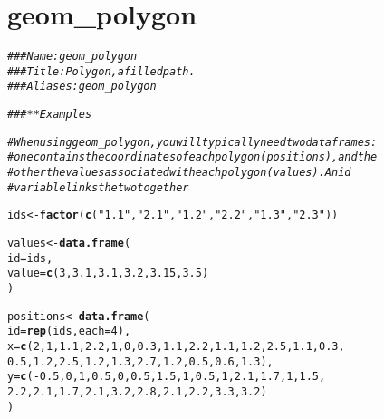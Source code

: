 \documentclass[a4paper,titlepage]{tufte-handout}\usepackage[]{graphicx}\usepackage[]{color}
\makeatletter
\newcommand{\hlnum}[1]{\textcolor[rgb]{0.686,0.059,0.569}{#1}}%
\newcommand{\hlstr}[1]{\textcolor[rgb]{0.192,0.494,0.8}{#1}}%
\newcommand{\hlcom}[1]{\textcolor[rgb]{0.678,0.584,0.686}{\textit{#1}}}%
\newcommand{\hlopt}[1]{\textcolor[rgb]{0,0,0}{#1}}%
\newcommand{\hlstd}[1]{\textcolor[rgb]{0.345,0.345,0.345}{#1}}%
\newcommand{\hlkwb}[1]{\textcolor[rgb]{0.69,0.353,0.396}{#1}}%
\newcommand{\hlkwc}[1]{\textcolor[rgb]{0.333,0.667,0.333}{#1}}%
\newcommand{\hlkwd}[1]{\textcolor[rgb]{0.737,0.353,0.396}{\textbf{#1}}}%
\newenvironment{kframe}{%
 \def\at@end@of@kframe{}%
 \ifinner\ifhmode%
  \def\at@end@of@kframe{\end{minipage}}%
  \begin{minipage}{\columnwidth}%
 \fi\fi%
 \def\FrameCommand##1{\hskip\@totalleftmargin \hskip-\fboxsep
 \colorbox{shadecolor}{##1}\hskip-\fboxsep
     \hskip-\linewidth \hskip-\@totalleftmargin \hskip\columnwidth}%
 \MakeFramed {\advance\hsize-\width
   \@totalleftmargin\z@ \linewidth\hsize
   \@setminipage}}%
 {\par\unskip\endMakeFramed%
 \at@end@of@kframe}
\newenvironment{knitrout}{}{} %
\makeatother
\begin{document}
\section{geom\_polygon}

\begin{knitrout}
\color{fgcolor}\begin{kframe}
\begin{alltt}
\hlcom{### Name: geom_polygon}
\hlcom{### Title: Polygon, a filled path.}
\hlcom{### Aliases: geom_polygon}

\hlcom{### ** Examples}

\hlcom{# When using geom_polygon, you will typically need two data frames:}
\hlcom{# one contains the coordinates of each polygon (positions),  and the}
\hlcom{# other the values associated with each polygon (values).  An id}
\hlcom{# variable links the two together}

\hlstd{ids} \hlkwb{<-} \hlkwd{factor}\hlstd{(}\hlkwd{c}\hlstd{(}\hlstr{"1.1"}\hlstd{,} \hlstr{"2.1"}\hlstd{,} \hlstr{"1.2"}\hlstd{,} \hlstr{"2.2"}\hlstd{,} \hlstr{"1.3"}\hlstd{,} \hlstr{"2.3"}\hlstd{))}

\hlstd{values} \hlkwb{<-} \hlkwd{data.frame}\hlstd{(}
  \hlkwc{id} \hlstd{= ids,}
  \hlkwc{value} \hlstd{=} \hlkwd{c}\hlstd{(}\hlnum{3}\hlstd{,} \hlnum{3.1}\hlstd{,} \hlnum{3.1}\hlstd{,} \hlnum{3.2}\hlstd{,} \hlnum{3.15}\hlstd{,} \hlnum{3.5}\hlstd{)}
\hlstd{)}

\hlstd{positions} \hlkwb{<-} \hlkwd{data.frame}\hlstd{(}
  \hlkwc{id} \hlstd{=} \hlkwd{rep}\hlstd{(ids,} \hlkwc{each} \hlstd{=} \hlnum{4}\hlstd{),}
  \hlkwc{x} \hlstd{=} \hlkwd{c}\hlstd{(}\hlnum{2}\hlstd{,} \hlnum{1}\hlstd{,} \hlnum{1.1}\hlstd{,} \hlnum{2.2}\hlstd{,} \hlnum{1}\hlstd{,} \hlnum{0}\hlstd{,} \hlnum{0.3}\hlstd{,} \hlnum{1.1}\hlstd{,} \hlnum{2.2}\hlstd{,} \hlnum{1.1}\hlstd{,} \hlnum{1.2}\hlstd{,} \hlnum{2.5}\hlstd{,} \hlnum{1.1}\hlstd{,} \hlnum{0.3}\hlstd{,}
  \hlnum{0.5}\hlstd{,} \hlnum{1.2}\hlstd{,} \hlnum{2.5}\hlstd{,} \hlnum{1.2}\hlstd{,} \hlnum{1.3}\hlstd{,} \hlnum{2.7}\hlstd{,} \hlnum{1.2}\hlstd{,} \hlnum{0.5}\hlstd{,} \hlnum{0.6}\hlstd{,} \hlnum{1.3}\hlstd{),}
  \hlkwc{y} \hlstd{=} \hlkwd{c}\hlstd{(}\hlopt{-}\hlnum{0.5}\hlstd{,} \hlnum{0}\hlstd{,} \hlnum{1}\hlstd{,} \hlnum{0.5}\hlstd{,} \hlnum{0}\hlstd{,} \hlnum{0.5}\hlstd{,} \hlnum{1.5}\hlstd{,} \hlnum{1}\hlstd{,} \hlnum{0.5}\hlstd{,} \hlnum{1}\hlstd{,} \hlnum{2.1}\hlstd{,} \hlnum{1.7}\hlstd{,} \hlnum{1}\hlstd{,} \hlnum{1.5}\hlstd{,}
  \hlnum{2.2}\hlstd{,} \hlnum{2.1}\hlstd{,} \hlnum{1.7}\hlstd{,} \hlnum{2.1}\hlstd{,} \hlnum{3.2}\hlstd{,} \hlnum{2.8}\hlstd{,} \hlnum{2.1}\hlstd{,} \hlnum{2.2}\hlstd{,} \hlnum{3.3}\hlstd{,} \hlnum{3.2}\hlstd{)}
\hlstd{)}


\end{alltt}
\end{kframe}
\end{knitrout}
\end{document}
